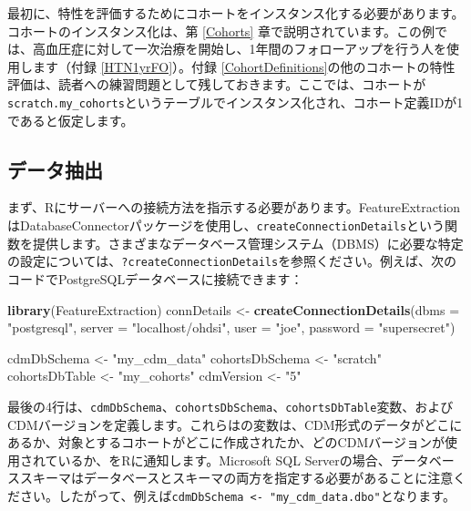 \documentclass[
  11pt]{book}
\newenvironment{Shaded}{\begin{snugshade}}{\end{snugshade}}
\newcommand{\AttributeTok}[1]{\textcolor[rgb]{0.13,0.29,0.53}{#1}}
\newcommand{\FunctionTok}[1]{\textcolor[rgb]{0.13,0.29,0.53}{\textbf{#1}}}
\newcommand{\NormalTok}[1]{#1}
\newcommand{\OtherTok}[1]{\textcolor[rgb]{0.56,0.35,0.01}{#1}}
\newcommand{\StringTok}[1]{\textcolor[rgb]{0.31,0.60,0.02}{#1}}
\theoremstyle{definition}
\theoremstyle{definition}
\theoremstyle{definition}
\theoremstyle{definition}
\theoremstyle{remark}
\begin{document}
最初に、特性を評価するためにコホートをインスタンス化する必要があります。コホートのインスタンス化は、第 \ref{Cohorts} 章で説明されています。この例では、高血圧症に対して一次治療を開始し、1年間のフォローアップを行う人を使用します（付録 \ref{HTN1yrFO}）。付録 \ref{CohortDefinitions}の他のコホートの特性評価は、読者への練習問題として残しておきます。ここでは、コホートが\texttt{scratch.my\_cohorts}というテーブルでインスタンス化され、コホート定義IDが1であると仮定します。

\subsection{データ抽出}\label{ux30c7ux30fcux30bfux62bdux51fa}

まず、Rにサーバーへの接続方法を指示する必要があります。FeatureExtractionはDatabaseConnectorパッケージを使用し、\texttt{createConnectionDetails}という関数を提供します。さまざまなデータベース管理システム（DBMS）に必要な特定の設定については、\texttt{?createConnectionDetails}を参照ください。例えば、次のコードでPostgreSQLデータベースに接続できます：

\begin{Shaded}
\begin{Highlighting}[]
\FunctionTok{library}\NormalTok{(FeatureExtraction)}
\NormalTok{connDetails }\OtherTok{\textless{}{-}} \FunctionTok{createConnectionDetails}\NormalTok{(}\AttributeTok{dbms =} \StringTok{"postgresql"}\NormalTok{,}
                                       \AttributeTok{server =} \StringTok{"localhost/ohdsi"}\NormalTok{,}
                                       \AttributeTok{user =} \StringTok{"joe"}\NormalTok{,}
                                       \AttributeTok{password =} \StringTok{"supersecret"}\NormalTok{)}

\NormalTok{cdmDbSchema }\OtherTok{\textless{}{-}} \StringTok{"my\_cdm\_data"}
\NormalTok{cohortsDbSchema }\OtherTok{\textless{}{-}} \StringTok{"scratch"}
\NormalTok{cohortsDbTable }\OtherTok{\textless{}{-}} \StringTok{"my\_cohorts"}
\NormalTok{cdmVersion }\OtherTok{\textless{}{-}} \StringTok{"5"}
\end{Highlighting}
\end{Shaded}

最後の4行は、\texttt{cdmDbSchema}、\texttt{cohortsDbSchema}、\texttt{cohortsDbTable}変数、およびCDMバージョンを定義します。これらはの変数は、CDM形式のデータがどこにあるか、対象とするコホートがどこに作成されたか、どのCDMバージョンが使用されているか、をRに通知します。Microsoft SQL Serverの場合、データベーススキーマはデータベースとスキーマの両方を指定する必要があることに注意ください。したがって、例えば\texttt{cdmDbSchema\ \textless{}-\ "my\_cdm\_data.dbo"}となります。
\end{document}
